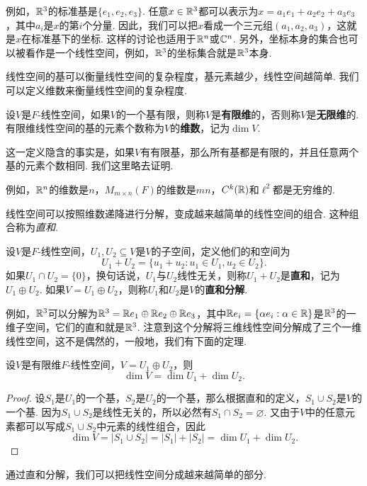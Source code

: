 例如，$\mathbb{R}^3$的标准基是$\{e_1,e_2,e_3\}$. 任意$x\in\mathbb{R}^3$都可以表示为$x=a_1e_1+a_2e_2+a_3e_3$，其中$a_i$是$x$的第$i$个分量. 因此，我们可以把$x$看成一个三元组$(a_1,a_2,a_3)$，这就是$x$在标准基下的坐标. 这样的讨论也适用于$\mathbb{R}^n$或$\mathbb{C}^n$. 另外，坐标本身的集合也可以被看作是一个线性空间，例如，$\mathbb{R}^3$的坐标集合就是$\mathbb{R}^3$本身. 

线性空间的基可以衡量线性空间的复杂程度，基元素越少，线性空间越简单. 我们可以定义维数来衡量线性空间的复杂程度. 

\begin{definition}[维数]
设$V$是$F$-线性空间，如果$V$的一个基有限，则称$V$是\textbf{有限维}的，否则称$V$是\textbf{无限维}的. 有限维线性空间的基的元素个数称为$V$的\textbf{维数}，记为$\dim V$. 
\end{definition}

这一定义隐含的事实是，如果$V$有有限基，那么所有基都是有限的，并且任意两个基的元素个数相同. 我们这里略去证明. 

例如，$\mathbb{R}^n$的维数是$n$，$M_{m\times n}(F)$的维数是$mn$，$C^k(\mathbb{R})$和$\ell^2$都是无穷维的. 

线性空间可以按照维数递降进行分解，变成越来越简单的线性空间的组合. 这种组合称为\emph{直和}. 

\begin{definition}[和空间与直和]
设$V$是$F$-线性空间，$U_1,U_2\subseteq V$是$V$的子空间，定义他们的和空间为
\[
    U_1+U_2=\{u_1+u_2:u_1\in U_1,u_2\in U_2\}.
\]
如果$U_1\cap U_2=\{0\}$，换句话说，$U_1$与$U_2$线性无关，则称$U_1+U_2$是\textbf{直和}，记为$U_1\oplus U_2$. 如果$V=U_1\oplus U_2$，则称$U_1$和$U_2$是$V$的\textbf{直和分解}. 
\end{definition}

例如，$\mathbb{R}^3$可以分解为$\mathbb{R}^3=\mathbb{R} e_1\oplus \mathbb{R} e_2\oplus \mathbb{R} e_3$，其中$\mathbb{R} e_i=\{\alpha e_i:\alpha\in\mathbb{R}\}$是$\mathbb{R}^3$的一维子空间，它们的直和就是$\mathbb{R}^3$. 注意到这个分解将三维线性空间分解成了三个一维线性空间，这不是偶然的，一般地，我们有下面的定理. 

\begin{theorem}[维数定理]\label{thm:dim-thm}
设$V$是有限维$F$-线性空间，$V=U_1\oplus U_2$，则
\[
    \dim V=\dim U_1+\dim U_2.
\]
\end{theorem}
\begin{proof}
    设$S_1$是$U_1$的一个基，$S_2$是$U_2$的一个基，那么根据直和的定义，$S_1\cup S_2$是$V$的一个基. 因为$S_1\cup S_2$是线性无关的，所以必然有$S_1\cap S_2=\varnothing$. 又由于$V$中的任意元素都可以写成$S_1\cup S_2$中元素的线性组合，因此
    \[
        \dim V=|S_1\cup S_2|=|S_1|+|S_2|=\dim U_1+\dim U_2.
    \]
\end{proof}
通过直和分解，我们可以把线性空间分成越来越简单的部分. 

